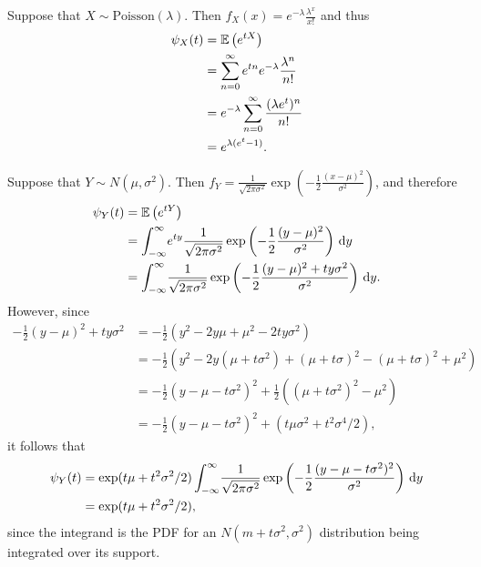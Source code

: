 \begin{ex}
  Suppose that $X\sim\text{Poisson}(\lambda)$. Then
  $f_X(x)=e^{-\lambda}\frac{\lambda^x}{x!}$ and thus
  \begin{align*}
    \psi_X(t)
     & =\mathbb{E}\left(e^{tX}\right)                                               \\
     & =\sum_{n=0}^\infty e^{tn}e^{-\lambda}\frac{\lambda^n}{n!} \\
     & =e^{-\lambda}\sum_{n=0}^\infty \frac{(\lambda e^t)^n}{n!} \\
     & =e^{\lambda(e^t-1)}.
  \end{align*}

  Suppose that $Y\sim N(\mu, \sigma^2)$. Then
  $f_Y=\frac{1}{\sqrt{2\pi\sigma^2}}
    \exp\left(-\frac{1}{2}\frac{(x-\mu)^2}{\sigma^2}\right)$,
  and therefore
  \begin{align*}
    \psi_Y(t)
     & =\mathbb{E}\left(e^{tY}\right)                                                  \\
     & =\int_{-\infty}^\infty\! e^{ty}\frac{1}{\sqrt{2\pi\sigma^2}}
    \exp\left(-\frac{1}{2}\frac{(y-\mu)^2}{\sigma^2}\right)\,\mathrm{d}{y}  \\
     & =\int_{-\infty}^\infty\! \frac{1}{\sqrt{2\pi\sigma^2}}
    \exp\left(-\frac{1}{2}\frac{(y-\mu)^2+ty\sigma^2}{\sigma^2}\right)\,\mathrm{d}{y}.
  \end{align*}
  However, since
  \begin{align*}
    -\frac{1}{2}(y-\mu)^2+ty\sigma^2
     & =-\frac{1}{2}(y^2-2y\mu+\mu^2-2ty\sigma^2)                                 \\
     & =-\frac{1}{2}(y^2-2y(\mu+t\sigma^2)+(\mu+t\sigma)^2-(\mu+t\sigma)^2+\mu^2) \\
     & =-\frac{1}{2}(y-\mu-t\sigma^2)^2+\frac{1}{2}((\mu+t\sigma^2)^2-\mu^2)      \\
     & =-\frac{1}{2}(y-\mu-t\sigma^2)^2+(t\mu\sigma^2+t^2\sigma^4/2),
  \end{align*}
  it follows that
  \begin{align*}
    \psi_Y(t)
     & =\exp(t\mu+t^2\sigma^2/2)\int_{-\infty}^\infty\! \frac{1}{\sqrt{2\pi\sigma^2}}
    \exp\left(-\frac{1}{2}\frac{(y-\mu-t\sigma^2)^2}{\sigma^2}\right)\,\mathrm{d}{y}          \\
     & =\exp(t\mu+t^2\sigma^2/2),
  \end{align*}
  since the integrand is the PDF for an $N(m+t\sigma^2, \sigma^2)$ distribution
  being integrated over its support.


\end{ex}
